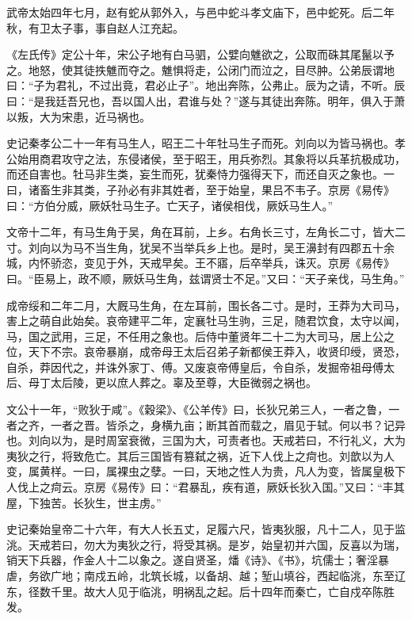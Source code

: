 \documentclass[12pt,UTF8]{ctexbook}
\begin{document}
武帝太始四年七月，赵有蛇从郭外入，与邑中蛇斗孝文庙下，邑中蛇死。后二年秋，有卫太子事，事自赵人江充起。



《左氏传》定公十年，宋公子地有白马驷，公嬖向魋欲之，公取而硃其尾鬣以予之。地怒，使其徒抶魋而夺之。魋惧将走，公闭门而泣之，目尽肿。公弟辰谓地曰：“子为君礼，不过出竟，君必止子”。地出奔陈，公弗止。辰为之请，不听。辰曰：“是我廷吾兄也，吾以国人出，君谁与处？”遂与其徒出奔陈。明年，俱入于萧以叛，大为宋患，近马祸也。



史记秦孝公二十一年有马生人，昭王二十年牡马生子而死。刘向以为皆马祸也。孝公始用商君攻守之法，东侵诸侯，至于昭王，用兵弥烈。其象将以兵革抗极成功，而还自害也。牡马非生类，妄生而死，犹秦恃力强得天下，而还自灭之象也。一曰，诸畜生非其类，子孙必有非其姓者，至于始皇，果吕不韦子。京房《易传》曰：“方伯分威，厥妖牡马生子。亡天子，诸侯相伐，厥妖马生人。”



文帝十二年，有马生角于吴，角在耳前，上乡。右角长三寸，左角长二寸，皆大二寸。刘向以为马不当生角，犹吴不当举兵乡上也。是时，吴王濞封有四郡五十余城，内怀骄恣，变见于外，天戒早矣。王不寤，后卒举兵，诛灭。京房《易传》曰。“臣易上，政不顺，厥妖马生角，兹谓贤士不足。”又曰：“天子亲伐，马生角。”



成帝绥和二年二月，大厩马生角，在左耳前，围长各二寸。是时，王莽为大司马，害上之萌自此始矣。哀帝建平二年，定襄牡马生驹，三足，随君饮食，太守以闻，马，国之武用，三足，不任用之象也。后侍中董贤年二十二为大司马，居上公之位，天下不宗。哀帝暴崩，成帝母王太后召弟子新都侯王莽入，收贤印绶，贤恐，自杀，莽因代之，并诛外家丁、傅。又废哀帝傅皇后，令自杀，发掘帝祖母傅太后、母丁太后陵，更以庶人葬之。辜及至尊，大臣微弱之祸也。



文公十一年，“败狄于咸”。《穀梁》、《公羊传》曰，长狄兄弟三人，一者之鲁，一者之齐，一者之晋。皆杀之，身横九亩；断其首而载之，眉见于轼。何以书？记异也。刘向以为，是时周室衰微，三国为大，可责者也。天戒若曰，不行礼义，大为夷狄之行，将致危亡。其后三国皆有篡弑之祸，近下人伐上之疴也。刘歆以为人变，属黄样。一曰，属裸虫之孽。一曰，天地之性人为贵，凡人为变，皆属皇极下人伐上之疴云。京房《易传》曰：“君暴乱，疾有道，厥妖长狄入国。”又曰：“丰其屋，下独苦。长狄生，世主虏。”



史记秦始皇帝二十六年，有大人长五丈，足履六尺，皆夷狄服，凡十二人，见于监洮。天戒若曰，勿大为夷狄之行，将受其祸。是岁，始皇初并六国，反喜以为瑞，销天下兵器，作金人十二以象之。遂自贤圣，燔《诗》、《书》，坑儒士；奢淫暴虐，务欲广地；南戍五岭，北筑长城，以备胡、越；堑山填谷，西起临洮，东至辽东，径数千里。故大人见于临洮，明祸乱之起。后十四年而秦亡，亡自戍卒陈胜发。
\end{document}
